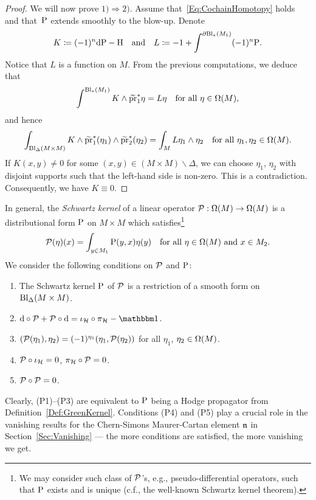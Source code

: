 \documentclass[\MainFolder/Text.tex]{subfiles}
\begin{document}
\begin{proof}
We will now prove $1) \Longrightarrow 2)$.
Assume that~\eqref{Eq:CochainHomotopy} holds and that~$\mathrm{P}$ extends smoothly to the blow-up.
Denote
\[K\coloneqq (-1)^n \mathrm{d} \mathrm{P} - \mathrm{H}\quad\text{and}\quad L\coloneqq -1 +  \int^{\partial \mathrm{Bl}_*(M_1)} (-1)^n \mathrm{P}. \]
Notice that $L$ is a function on $M$.
From the previous computations, we deduce that 
\[ \int^{\mathrm{Bl}_*(M_1)} K\wedge \widetilde{\operatorname{\mathrm{pr}}}_1^*\eta = L\eta\quad\text{for all }\eta\in \Omega(M), \]
and hence
\[ \int_{\mathrm{Bl}_{\Delta}(M\times M)} K \wedge \widetilde{\operatorname{\mathrm{pr}}}_1^*(\eta_1) \wedge \widetilde{\operatorname{\mathrm{pr}}}_2^*(\eta_2)  = \int_M L \eta_1 \wedge \eta_2 \quad\text{for all }\eta_1, \eta_2 \in \Omega(M). \]
If $K(x,y) \neq 0$ for some $(x,y)\in (M\times M)\backslash\Delta$, we can choose $\eta_1$, $\eta_2$ with disjoint supports such that the left-hand side is non-zero.
This is a contradiction.
Consequently, we have $K\equiv 0$.
\end{proof}

In general, the \emph{Schwartz kernel} of a linear operator $\mathcal{P}: \Omega(M) \rightarrow \Omega(M)$ is a distributional form $\mathrm{P}$ on $M\times M$ which satisfies\footnote{We may consider such class of $\mathcal{P}$'s, e.g., pseudo-differential operators, such that $\mathrm{P}$ exists and is unique (c.f., the well-known Schwartz kernel theorem).} 
\begin{equation*} 
\mathcal{P}(\eta)(x) = \int_{y\in M_1} \mathrm{P}(y,x)\eta(y)\quad\text{for all }\eta\in \Omega(M)\text{ and }x\in M_2.
\end{equation*}
We consider the following conditions on $\mathcal{P}$ and $\mathrm{P}$:\label{ConditionsG} 
\begin{center}
\begin{minipage}{.9\textwidth}
\begin{enumerate}[label=(P\arabic*)]
\item The Schwartz kernel $\mathrm{P}$ of $\mathcal{P}$ is a restriction of a smooth form on $\mathrm{Bl}_\Delta(M\times M)$.
\item $\Dd\circ \Htp + \Htp\circ \Dd = \iota_{\Harm} \circ \pi_\Harm - \Id$.
\item $(\mathcal{P}(\eta_1),\eta_2) = (-1)^{\eta_1}(\eta_1,\mathcal{P}(\eta_2))$ for all $\eta_1$, $\eta_2\in \Omega(M)$.
\item $\mathcal{P} \circ \iota_{\mathcal{H}} = 0$, $\pi_{\mathcal{H}} \circ \mathcal{P} = 0$.
\item $\mathcal{P} \circ \mathcal{P} = 0$.
\end{enumerate}
\end{minipage}
\end{center}
Clearly, (P1)--(P3) are equivalent to $\mathrm{P}$ being a Hodge propagator from Definition~\ref{Def:GreenKernel}.
Conditions (P4) and (P5) play a crucial role in the vanishing results for the Chern-Simons Maurer-Cartan element $\mathfrak{n}$ in Section~\ref{Sec:Vanishing} --- the more conditions are satisfied, the more vanishing we get.
\end{document}
